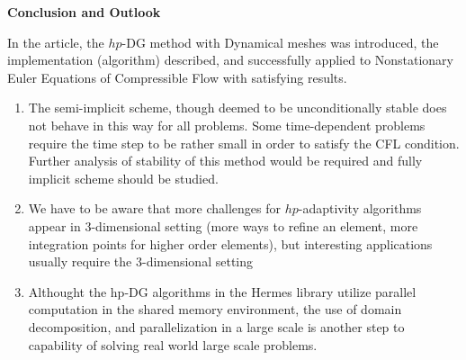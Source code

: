 \newpage
\begin{flushleft}
{\LARGE{\textbf{{Conclusion and Outlook}}}}
\end{flushleft}
In the article, the $hp$-DG method with Dynamical meshes was introduced, the implementation (algorithm) described, and successfully applied to Nonstationary Euler Equations of Compressible Flow with satisfying results.
\begin{enumerate}
\item The semi-implicit scheme, though deemed to be unconditionally stable does not behave in this way for all problems. Some time-dependent problems require the time step to be rather small in order to satisfy the CFL condition. Further analysis of stability of this method would be required and fully implicit scheme should be studied.
\item We have to be aware that more challenges for $hp$-adaptivity algorithms appear in 3-dimensional setting (more ways to refine an element, more integration points for higher order elements), but interesting applications usually require the 3-dimensional setting
\item Althought the hp-DG algorithms in the Hermes library utilize parallel computation in the shared memory environment, the use of domain decomposition, and parallelization in a large scale is another step to capability of solving real world large scale problems.
\end{enumerate}
